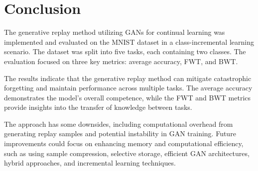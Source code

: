 \documentclass{article}
\begin{document}
\section{Conclusion}
The generative replay method utilizing GANs for continual learning was implemented and evaluated on the MNIST dataset in a class-incremental learning scenario. The dataset was split into five tasks, each containing two classes. The evaluation focused on three key metrics: average accuracy, FWT, and BWT.

The results indicate that the generative replay method can mitigate catastrophic forgetting and maintain performance across multiple tasks. The average accuracy demonstrates the model's overall competence, while the FWT and BWT metrics provide insights into the transfer of knowledge between tasks. 

The approach has some downsides, including computational overhead from generating replay samples and potential instability in GAN training. Future improvements could focus on enhancing memory and computational efficiency, such as using sample compression, selective storage, efficient GAN architectures, hybrid approaches, and incremental learning techniques.
\end{document}

